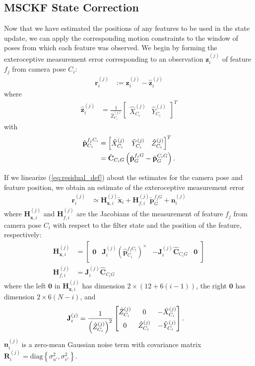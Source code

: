 \documentclass[letterpaper, 10 pt, conference]{ieeeconf}  %
\def\Vec#1{\mathbf{#1}}
\newcommand{\bbm}{\begin{bmatrix}}
\newcommand{\ebm}{\end{bmatrix}}
\begin{document}
\subsection{MSCKF State Correction}
Now that we have estimated the positions of any features to be used in the state update, we can apply the corresponding motion constraints to the window of poses from which each feature was observed.
We begin by forming the exteroceptive measurement error corresponding to an observation $\Vec{z}_i^{(j)}$ of feature $f_j$ from camera pose $C_i$:
\begin{align} \label{eq:residual_def}
    \Vec{r}_i^{(j)} &:= \Vec{z}_i^{(j)} - \hat{\Vec{z}}_i^{(j)}
\end{align}
where
\begin{align}
    \hat{\Vec{z}}_i^{(j)} &= \frac{1}{\hat{Z}^{(j)}_{C_i}} \bbm \hat{X}^{(j)}_{C_i} & \hat{Y}^{(j)}_{C_i} \ebm ^T
\end{align}
with 
\begin{align}
    \hat{\Vec{p}}_{C_i}^{f_j C_i} &= \bbm \hat{X}^{(j)}_{C_i} & \hat{Y}^{(j)}_{C_i} & \hat{Z}^{(j)}_{C_i} \ebm ^T \notag \\
                                 &= \hat{\Vec{C}}_{C_i G} \left( \hat{\Vec{p}}_G^{f_j G} - \hat{\Vec{p}}_G^{C_i G} \right).
\end{align}

If we linearize (\ref{eq:residual_def}) about the estimates for the camera pose and feature position, we obtain an estimate of the exteroceptive measurement error
\begin{align}
    \Vec{r}_i^{(j)} &\simeq \Vec{H}_{\Vec{x}, i}^{(j)} \widetilde{\Vec{x}}_i + \Vec{H}_{f, i}^{(j)} \widetilde{\Vec{p}}_G^{f_j G} + \Vec{n}_i^{(j)}
\end{align}
where $\Vec{H}_{\Vec{x}, i}^{(j)}$ and $\Vec{H}_{f, i}^{(j)}$ are the Jacobians of the measurement of feature $f_j$ from camera pose $C_i$ with respect to the filter state and the position of the feature, respectively:
\begin{align}
    \Vec{H}_{\Vec{x}, i}^{(j)} &= \bbm \Vec{0} & \Vec{J}^{\left(j\right)}_i \left(\hat{\Vec{p}}_{C_i}^{f_j C_i}\right)^\times & -\Vec{J}^{\left(j\right)}_i \hat{\Vec{C}}_{C_i G} & \Vec{0} \ebm \\
    \Vec{H}_{f, i}^{(j)} &= \Vec{J}^{\left(j\right)}_i \hat{\Vec{C}}_{C_i G}
\end{align}
where the left $\Vec{0}$ in $\Vec{H}_{\Vec{x}, i}^{(j)}$ has dimension $2\times\left(12+6\left(i-1\right)\right)$, the right $\Vec{0}$ has dimension $2\times6\left(N-i\right)$, and
\begin{align}
    \Vec{J}^{\left(j\right)}_i &= \frac{1}{\left(\hat{Z}^{(j)}_{C_i}\right)^2}
    \bbm \hat{Z}^{(j)}_{C_i} & 0 & -\hat{X}^{(j)}_{C_i} \vspace{0.5em} \\
             0 & \hat{Z}^{(j)}_{C_i} & -\hat{Y}^{(j)}_{C_i}
    \ebm .
\end{align}
$\Vec{n}_i^{(j)}$ is a zero-mean Gaussian noise term with covariance matrix $\Vec{R}_i^{(j)} = \text{diag}\left\{\sigma^2_{u'}, \sigma^2_{v'}\right\}$.
\end{document}
